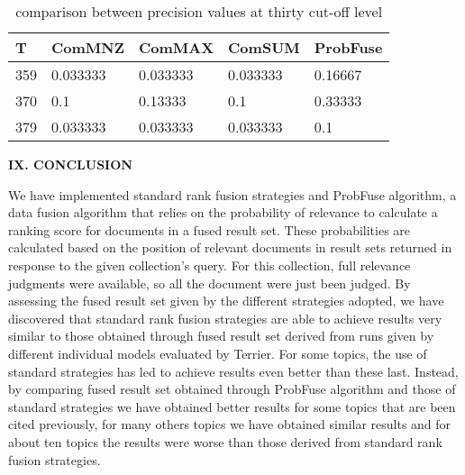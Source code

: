 \documentclass[12pt,journal]{IEEEtran}
\begin{document}
\begin{table}[h!]
\centering
\caption{comparison between precision values at thirty cut-off level}
\begin{tabular}{|l|l|l|l|l|}
\hline
T   & ComMNZ   & ComMAX   & ComSUM   & ProbFuse \\ \hline
359 & 0.033333 & 0.033333 & 0.033333 & 0.16667  \\ \hline
370 & 0.1      & 0.13333  & 0.1      & 0.33333  \\ \hline
379 & 0.033333 & 0.033333 & 0.033333 & 0.1     \\ \hline
\end{tabular}
\end{table}

\textbf{IX.	CONCLUSION}

We have implemented standard rank fusion strategies and ProbFuse algorithm, a data fusion algorithm that relies on the probability of relevance to calculate a ranking score for documents in a fused result set.
These probabilities are calculated based on the position of relevant documents in result sets returned in response to the given collection’s query. For this collection, full relevance judgments were available, so all the document were just been judged. 
By assessing the fused result set given by the different strategies adopted, we have discovered that standard rank fusion strategies are able to achieve results very similar to those obtained through fused result set derived from runs given by different individual models evaluated by Terrier. For some topics, the use of standard strategies has led to achieve results even better than these last. Instead, by comparing fused result set obtained through ProbFuse algorithm and those of standard strategies we have obtained better results for some topics that are been cited previously, for many others topics we have obtained similar results and for about ten topics the results were worse than those derived from standard rank fusion strategies.

\end{document}
